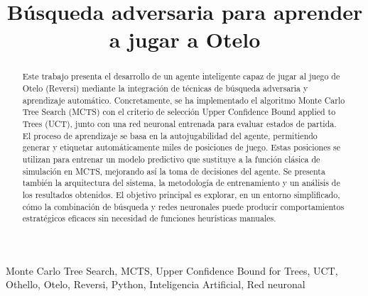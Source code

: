 \documentclass[conference]{IEEEtran}
\begin{document}
\title{Búsqueda adversaria para aprender a jugar a Otelo}

\author{
    \and
}

\maketitle

\begin{abstract}
Este trabajo presenta el desarrollo de un agente inteligente capaz de jugar al juego de Otelo (Reversi) mediante la integración de técnicas de búsqueda adversaria y aprendizaje automático. Concretamente, se ha implementado el algoritmo Monte Carlo Tree Search (MCTS) con el criterio de selección Upper Confidence Bound applied to Trees (UCT), junto con una red neuronal entrenada para evaluar estados de partida. El proceso de aprendizaje se basa en la autojugabilidad del agente, permitiendo generar y etiquetar automáticamente miles de posiciones de juego. Estas posiciones se utilizan para entrenar un modelo predictivo que sustituye a la función clásica de simulación en MCTS, mejorando así la toma de decisiones del agente. Se presenta también la arquitectura del sistema, la metodología de entrenamiento y un análisis de los resultados obtenidos. El objetivo principal es explorar, en un entorno simplificado, cómo la combinación de búsqueda y redes neuronales puede producir comportamientos estratégicos eficaces sin necesidad de funciones heurísticas manuales.
\end{abstract}

\begin{IEEEkeywords}
Monte Carlo Tree Search, MCTS, Upper Confidence Bound for Trees, UCT, Othello, Otelo, Reversi, Python, Inteligencia Artificial, Red neuronal
\end{IEEEkeywords}

\end{document}
